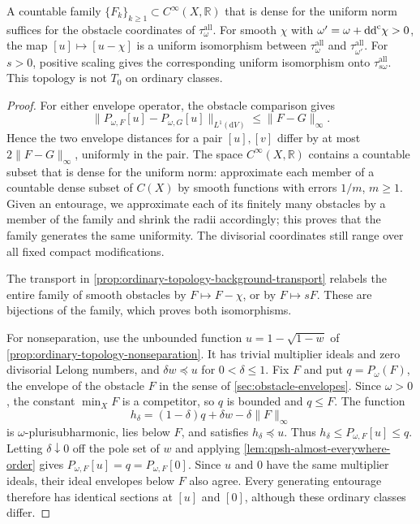 \begin{proposition}\label{prop:all-obstacle-uniformity}
A countable family $\{F_k\}_{k\geq1}\subset C^\infty(X,\mathbb R)$ that is dense for the uniform norm suffices for the obstacle coordinates of $\tau^{\mathrm{all}}_\omega$. For smooth $\chi$ with $\omega'=\omega+\mathrm{dd}^{\mathrm{c}}\chi>0$, the map $[u]\mapsto[u-\chi]$ is a uniform isomorphism between $\tau^{\mathrm{all}}_\omega$ and $\tau^{\mathrm{all}}_{\omega'}$. For $s>0$, positive scaling gives the corresponding uniform isomorphism onto $\tau^{\mathrm{all}}_{s\omega}$. This topology is not $T_0$ on ordinary classes.
\end{proposition}
\begin{proof}
For either envelope operator, the obstacle comparison gives
\[
 \|P_{\omega,F}[u]-P_{\omega,G}[u]\|_{L^1(\mathrm dV)}
 \leq\|F-G\|_\infty.
\]
Hence the two envelope distances for a pair $[u],[v]$ differ by at most $2\|F-G\|_\infty$, uniformly in the pair. The space $C^\infty(X,\mathbb R)$ contains a countable subset that is dense for the uniform norm: approximate each member of a countable dense subset of $C(X)$ by smooth functions with errors $1/m$, $m\geq1$. Given an entourage, we approximate each of its finitely many obstacles by a member of the family and shrink the radii accordingly; this proves that the family generates the same uniformity. The divisorial coordinates still range over all fixed compact modifications.

The transport in \cref{prop:ordinary-topology-background-transport} relabels the entire family of smooth obstacles by $F\mapsto F-\chi$, or by $F\mapsto sF$. These are bijections of the family, which proves both isomorphisms.

For nonseparation, use the unbounded function $u=1-\sqrt{1-w}$ of \cref{prop:ordinary-topology-nonseparation}. It has trivial multiplier ideals and zero divisorial Lelong numbers, and $\delta w\preceq u$ for $0<\delta\leq1$. Fix $F$ and put $q=P_\omega(F)$, the envelope of the obstacle $F$ in the sense of \cref{sec:obstacle-envelopes}. Since $\omega>0$, the constant $\min_XF$ is a competitor, so $q$ is bounded and $q\leq F$. The function
\[
 h_\delta=(1-\delta)q+\delta w-\delta\|F\|_\infty
\]
is $\omega$-plurisubharmonic, lies below $F$, and satisfies $h_\delta\preceq u$. Thus $h_\delta\leq P_{\omega,F}[u]\leq q$. Letting $\delta\downarrow0$ off the pole set of $w$ and applying \cref{lem:qpsh-almost-everywhere-order} gives $P_{\omega,F}[u]=q=P_{\omega,F}[0]$. Since $u$ and $0$ have the same multiplier ideals, their ideal envelopes below $F$ also agree. Every generating entourage therefore has identical sections at $[u]$ and $[0]$, although these ordinary classes differ.
\end{proof}

